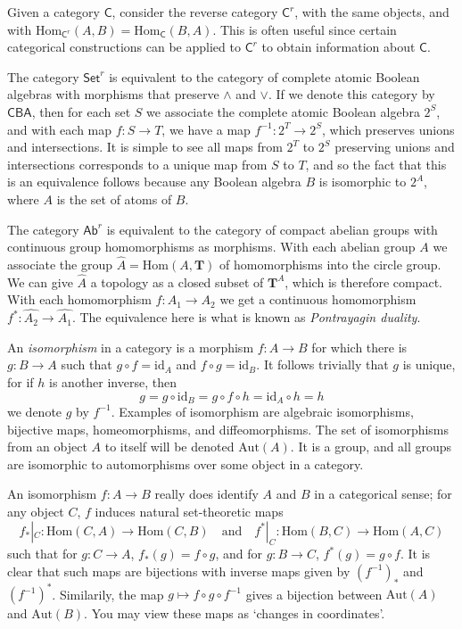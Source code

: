 Given a category $\mathsf{C}$, consider the reverse category $\mathsf{C}^{r}$, with the same objects, and with $\text{Hom}_{\mathsf{C}^r}(A,B) = \text{Hom}_{\mathsf{C}}(B,A)$. This is often useful since certain categorical constructions can be applied to $\mathsf{C}^r$ to obtain information about $\mathsf{C}$.

\begin{example}
    The category $\mathsf{Set}^r$ is equivalent to the category of complete atomic Boolean algebras with morphisms that preserve $\wedge$ and $\vee$. If we denote this category by $\mathsf{CBA}$, then for each set $S$ we associate the complete atomic Boolean algebra $2^S$, and with each map $f: S \to T$, we have a map $f^{-1}: 2^T \to 2^S$, which preserves unions and intersections. It is simple to see all maps from $2^T$ to $2^S$ preserving unions and intersections corresponds to a unique map from $S$ to $T$, and so the fact that this is an equivalence follows because any Boolean algebra $B$ is isomorphic to $2^A$, where $A$ is the set of atoms of $B$.
\end{example}

\begin{example}
    The category $\mathsf{Ab}^r$ is equivalent to the category of compact abelian groups with continuous group homomorphisms as morphisms. With each abelian group $A$ we associate the group $\widehat{A} = \text{Hom}(A,\mathbf{T})$ of homomorphisms into the circle group. We can give $\widehat{A}$ a topology as a closed subset of $\mathbf{T}^A$, which is therefore compact. With each homomorphism $f: A_1 \to A_2$ we get a continuous homomorphism $f^*: \widehat{A_2} \to \widehat{A_1}$. The equivalence here is what is known as \emph{Pontrayagin duality}.
\end{example}

An \emph{isomorphism} in a category is a morphism $f:A \to B$ for which there is $g: B \to A$ such that $g \circ f = \text{id}_A$ and $f \circ g = \text{id}_B$. It follows trivially that $g$ is unique, for if $h$ is another inverse, then
%
\[ g = g \circ \text{id}_B = g \circ f \circ h = \text{id}_A \circ h = h \]
%
we denote $g$ by $f^{-1}$. Examples of isomorphism are algebraic isomorphisms, bijective maps, homeomorphisms, and diffeomorphisms. The set of isomorphisms from an object $A$ to itself will be denoted $\text{Aut}(A)$. It is a group, and all groups are isomorphic to automorphisms over some object in a category.

An isomorphism $f: A \to B$ really does identify $A$ and $B$ in a categorical sense; for any object $C$, $f$ induces natural set-theoretic maps
%
\[ f_*|_C: \text{Hom}(C,A) \to \text{Hom}(C,B) \quad\text{and}\quad f^*|_C: \text{Hom}(B,C) \to \text{Hom}(A,C) \]
%
such that for $g: C \to A$, $f_*(g) = f \circ g$, and for $g: B \to C$, $f^*(g) = g \circ f$. It is clear that such maps are bijections with inverse maps given by $(f^{-1})_*$ and $(f^{-1})^*$. Similarily, the map $g \mapsto f \circ g \circ f^{-1}$ gives a bijection between $\text{Aut}(A)$ and $\text{Aut}(B)$. You may view these maps as `changes in coordinates'.


